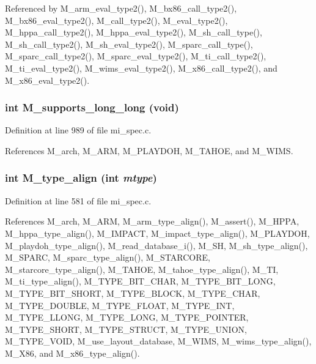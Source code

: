 Referenced by M\_\-arm\_\-eval\_\-type2(), M\_\-bx86\_\-call\_\-type2(), M\_\-bx86\_\-eval\_\-type2(), M\_\-call\_\-type2(), M\_\-eval\_\-type2(), M\_\-hppa\_\-call\_\-type2(), M\_\-hppa\_\-eval\_\-type2(), M\_\-sh\_\-call\_\-type(), M\_\-sh\_\-call\_\-type2(), M\_\-sh\_\-eval\_\-type2(), M\_\-sparc\_\-call\_\-type(), M\_\-sparc\_\-call\_\-type2(), M\_\-sparc\_\-eval\_\-type2(), M\_\-ti\_\-call\_\-type2(), M\_\-ti\_\-eval\_\-type2(), M\_\-wims\_\-eval\_\-type2(), M\_\-x86\_\-call\_\-type2(), and M\_\-x86\_\-eval\_\-type2().
\subsubsection{\setlength{\rightskip}{0pt plus 5cm}int M\_\-supports\_\-long\_\-long (void)}\label{mi__spec_8c_e676ec5da379bec93660cec420e81ccb}




Definition at line 989 of file mi\_\-spec.c.

References M\_\-arch, M\_\-ARM, M\_\-PLAYDOH, M\_\-TAHOE, and M\_\-WIMS.
\subsubsection{\setlength{\rightskip}{0pt plus 5cm}int M\_\-type\_\-align (int {\em mtype})}\label{mi__spec_8c_2f6d63b07dd89b867bbcc843075b639e}




Definition at line 581 of file mi\_\-spec.c.

References M\_\-arch, M\_\-ARM, M\_\-arm\_\-type\_\-align(), M\_\-assert(), M\_\-HPPA, M\_\-hppa\_\-type\_\-align(), M\_\-IMPACT, M\_\-impact\_\-type\_\-align(), M\_\-PLAYDOH, M\_\-playdoh\_\-type\_\-align(), M\_\-read\_\-database\_\-i(), M\_\-SH, M\_\-sh\_\-type\_\-align(), M\_\-SPARC, M\_\-sparc\_\-type\_\-align(), M\_\-STARCORE, M\_\-starcore\_\-type\_\-align(), M\_\-TAHOE, M\_\-tahoe\_\-type\_\-align(), M\_\-TI, M\_\-ti\_\-type\_\-align(), M\_\-TYPE\_\-BIT\_\-CHAR, M\_\-TYPE\_\-BIT\_\-LONG, M\_\-TYPE\_\-BIT\_\-SHORT, M\_\-TYPE\_\-BLOCK, M\_\-TYPE\_\-CHAR, M\_\-TYPE\_\-DOUBLE, M\_\-TYPE\_\-FLOAT, M\_\-TYPE\_\-INT, M\_\-TYPE\_\-LLONG, M\_\-TYPE\_\-LONG, M\_\-TYPE\_\-POINTER, M\_\-TYPE\_\-SHORT, M\_\-TYPE\_\-STRUCT, M\_\-TYPE\_\-UNION, M\_\-TYPE\_\-VOID, M\_\-use\_\-layout\_\-database, M\_\-WIMS, M\_\-wims\_\-type\_\-align(), M\_\-X86, and M\_\-x86\_\-type\_\-align().
